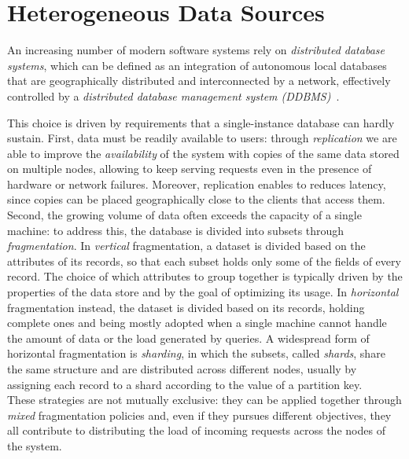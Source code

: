 
\section{Heterogeneous Data Sources}\label{sec:heterogeneous-data-sources}
An increasing number of modern software systems rely on \textit{distributed
database systems}, which can be defined as an integration of autonomous local
databases that are geographically distributed and interconnected by a network,
effectively controlled by a \textit{distributed database management system
({DDBMS})}~\cite{vikiru2023overview}.

This choice is driven by requirements that a single-instance database can
hardly sustain. First, data must be readily available to users: through
\textit{replication} we are able to improve the \textit{availability} of the
system with copies of the same data stored on multiple nodes, allowing to keep
serving requests even in the presence of hardware or network failures. Moreover,
replication enables to reduces latency, since copies can be placed
geographically close to the clients that access them. Second, the growing volume
of data often exceeds the capacity of a single machine: to address this, the
database is divided into subsets through \textit{fragmentation}. In
\textit{vertical} fragmentation, a dataset is divided based on the attributes of
its records, so that each subset holds only some of the fields of every record.
The choice of which attributes to group together is typically driven by the
properties of the data store and by the goal of optimizing its usage. In
\textit{horizontal} fragmentation instead, the dataset is divided based on its
records, holding complete ones and being mostly adopted when a single machine
cannot handle the amount of data or the load generated by queries. A widespread
form of horizontal fragmentation is \textit{sharding}, in which the subsets,
called \textit{shards}, share the same structure and are distributed across
different nodes, usually by assigning each record to a shard according to the
value of a partition key. \\ 
These strategies are not mutually exclusive: they can be applied together
through \textit{mixed} fragmentation policies and, even if they pursues
different objectives, they all contribute to distributing the load of incoming
requests across the nodes of the system.

